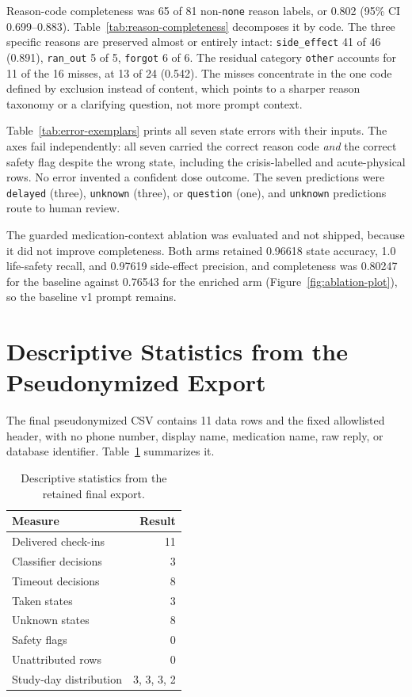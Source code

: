 Reason-code completeness was 65 of 81 non-\texttt{none} reason labels, or 0.802
(95\% CI 0.699--0.883). Table~\ref{tab:reason-completeness} decomposes it by
code. The three specific reasons are preserved almost or entirely intact:
\texttt{side\_effect} 41 of 46 (0.891), \texttt{ran\_out} 5 of 5,
\texttt{forgot} 6 of 6. The residual category \texttt{other} accounts for 11 of
the 16 misses, at 13 of 24 (0.542). The misses concentrate in the one code
defined by exclusion instead of content, which points to a sharper reason taxonomy or a
clarifying question, not more prompt context.



Table~\ref{tab:error-exemplars} prints all seven state errors with their inputs.
The axes fail independently: all seven carried the correct reason code
\emph{and} the correct safety flag despite the wrong state, including the
crisis-labelled and acute-physical rows. No error invented a confident dose
outcome. The seven predictions were \texttt{delayed} (three), \texttt{unknown}
(three), or \texttt{question} (one), and \texttt{unknown} predictions route to
human review.



The guarded medication-context ablation was evaluated and not shipped, because
it did not improve completeness. Both arms retained 0.96618 state accuracy, 1.0
life-safety recall, and 0.97619 side-effect precision, and completeness was
0.80247 for the baseline against 0.76543 for the enriched arm
(Figure~\ref{fig:ablation-plot}), so the baseline v1 prompt remains.

\section{Descriptive Statistics from the Pseudonymized Export}

The final pseudonymized CSV contains 11 data rows and the fixed allowlisted
header, with no phone number, display name, medication name, raw reply, or
database identifier. Table~\ref{tab:export-results} summarizes it.

\begin{table}[htbp]
  \centering
  \caption{Descriptive statistics from the retained final export.}
  \label{tab:export-results}
  \begin{tabular}{lr}
    \toprule
    Measure & Result \\
    \midrule
    Delivered check-ins & 11 \\
    Classifier decisions & 3 \\
    Timeout decisions & 8 \\
    Taken states & 3 \\
    Unknown states & 8 \\
    Safety flags & 0 \\
    Unattributed rows & 0 \\
    Study-day distribution & 3, 3, 3, 2 \\
    \bottomrule
  \end{tabular}
\end{table}

